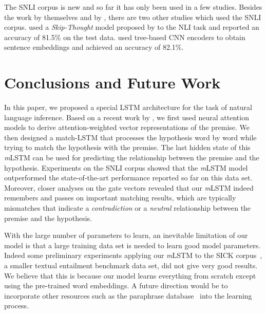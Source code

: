 \documentclass[11pt,letterpaper]{article}
\begin{document}
The SNLI corpus is new and so far it has only been used in a few studies.
Besides the work by  themselves and by , there are two other studies which used the SNLI corpus.
 used a \emph{Skip-Thought} model proposed by  to the NLI task and reported an accuracy of 81.5\% on the test data.
 used tree-based CNN encoders to obtain sentence embeddings and achieved an accuracy of 82.1\%.

 \section{Conclusions and Future Work}

In this paper, we proposed a special LSTM architecture for the task of natural language inference.
Based on a recent work by , we first used neural attention models to derive attention-weighted vector representations of the premise.
We then designed a match-LSTM that processes the hypothesis word by word while trying to match the hypothesis with the premise.
The last hidden state of this \emph{m}LSTM can be used for predicting the relationship between the premise and the hypothesis.
Experiments on the SNLI corpus showed that the \emph{m}LSTM model outperformed the state-of-the-art performance reported so far on this data set.
Moreover, closer analyses on the gate vectors revealed that our \emph{m}LSTM indeed remembers and passes on important matching results, which are typically mismatches that indicate a \emph{contradiction} or a \emph{neutral} relationship between the premise and the hypothesis.

With the large number of parameters to learn, an inevitable limitation of our model 
is that a large training data set is needed to learn good model parameters.
Indeed some preliminary experiments applying our \emph{m}LSTM to the SICK corpus~\cite{marelli:lrec14}, a smaller textual entailment benchmark data set, did not give very good results.
We believe that this is because our model learns everything from scratch except using the pre-trained word embeddings.
A future direction would be to incorporate other resources such as the paraphrase database~\cite{ganitkevitch:naacl13} into the learning process. 



\end{document}

